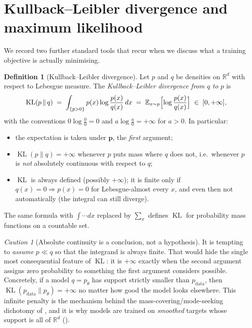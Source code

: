 \documentclass[11pt,a4paper]{report}
\theoremstyle{definition}
\newtheorem{definition}[definition]{Definition}
\theoremstyle{remark}
\newtheorem{caution}[caution]{Caution}
\DeclareMathOperator{\KL}{KL}
\newcommand{\RR}{\mathbb R}
\newcommand{\EE}{\mathbb E}
\begin{document}
\section{Kullback--Leibler divergence and maximum likelihood}
\label{sec:kl-mle}

We record two further standard tools that recur when we discuss what a
training objective is actually minimising.

\begin{definition}[Kullback--Leibler divergence]
\label{def:kl}
Let $p$ and $q$ be densities on $\RR^d$ with respect to Lebesgue measure.
The \emph{Kullback--Leibler divergence from $q$ to $p$} is
\[
\KL(p\,\|\,q)
\;=\; \int_{\{p>0\}} p(x)\log\frac{p(x)}{q(x)}\,dx
\;=\; \EE_{x\sim p}\Bigl[\log\frac{p(x)}{q(x)}\Bigr]
\;\in\;[0,+\infty] ,
\]
with the conventions $0\log\tfrac{0}{0}=0$ and $a\log\tfrac{a}{0}=+\infty$ for
$a>0$. In particular:
\begin{itemize}[nosep]
\item the expectation is taken under $\mathbf{p}$, the \emph{first} argument;
\item $\KL(p\|q)=+\infty$ whenever $p$ puts mass where $q$ does not, i.e.\
whenever $p$ is \emph{not} absolutely continuous with respect to $q$;
\item $\KL$ is always defined (possibly $+\infty$); it is finite only if
$q(x)=0\Rightarrow p(x)=0$ for Lebesgue-almost every $x$, and even then not
automatically (the integral can still diverge).
\end{itemize}
The same formula with $\int\!\cdots dx$ replaced by $\sum_x$ defines $\KL$ for
probability mass functions on a countable set.
\end{definition}

\begin{caution}[Absolute continuity is a conclusion, not a hypothesis]
\label{caution:kl-abs-cont}
It is tempting to \emph{assume} $p\ll q$ so that the integrand is always
finite. That would hide the single most consequential feature of $\KL$: it
is $+\infty$ exactly when the second argument assigns zero probability to
something the first argument considers possible. Concretely, if a model
$q=p_\theta$ has support strictly smaller than $p_{\mathrm{data}}$, then
$\KL(p_{\mathrm{data}}\|p_\theta)=+\infty$ no matter how good the model looks
elsewhere. This infinite penalty is the mechanism behind the
mass-covering/mode-seeking dichotomy of , and it
is why models are trained on \emph{smoothed} targets whose support is all of
$\RR^d$ (\Cref{caution:score-domain}).
\end{caution}
\end{document}
